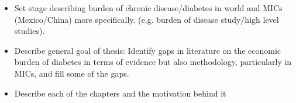 \documentclass[12pt,english]{article}
\begin{document}
\begin{itemize}
\item Set stage describing burden of chronic disease/diabetes in world and MICs (Mexico/China) more specifically.  (e.g. burden of disease study/high level studies).
\item Describe general goal of thesis:
\subitem Identify gaps in literature on the economic burden of diabetes in terms of evidence but also methodology, particularly in MICs, and fill some of the gaps.
\item Describe each of the chapters and the motivation behind it
\subitem 
\end{itemize}
\end{document}
